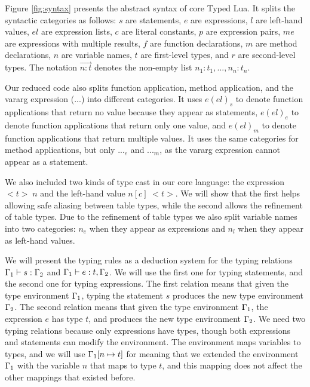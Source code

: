 Figure \ref{fig:syntax} presents the abstract syntax of core Typed Lua.
It splits the syntactic categories as follows:
$s$ are statements, $e$ are expressions, $l$ are left-hand values,
$el$ are expression lists, $c$ are literal constants, $p$ are expression pairs,
$me$ are expressions with multiple results, $f$ are function declarations,
$m$ are method declarations, $n$ are variable names,
$t$ are first-level types, and $r$ are second-level types.
The notation $\vec{n{:}t}$ denotes the non-empty list
$n_{1}{:}t_{1}, ..., n_{n}{:}t_{n}$.

Our reduced code also splits function application, method application, and
the vararg expression (${...}$) into different categories.
It uses $e(el)_{s}$ to denote function applications that return no value
because they appear as statements,
$e(el)_{e}$ to denote function applications that return only one value,
and $e(el)_{m}$ to denote function applications that return multiple values.
It uses the same categories for method applications, but only ${...}_{e}$
and ${...}_{m}$, as the vararg expression cannot appear as a statement.

We also included two kinds of type cast in our core language:
the expression ${<}t{>} \;n$ and the left-hand value $n[c] \; {<}t{>}$.
We will show that the first helps allowing safe aliasing between
table types, while the second allows the refinement of table types.
Due to the refinement of table types we also split variable names
into two categories: $n_{e}$ when they appear as expressions and
$n_{l}$ when they appear as left-hand values.

We will present the typing rules as a deduction system for the typing
relations $\Gamma_{1} \vdash s : \Gamma_{2}$ and $\Gamma_{1} \vdash e : t, \Gamma_{2}$. 
We will use the first one for typing statements, and the second one
for typing expressions.
The first relation means that given the type environment $\Gamma_{1}$,
typing the statement $s$ produces the new type environment $\Gamma_{2}$. 
The second relation means that given the type environment $\Gamma_{1}$,
the expression $e$ has type $t$, and produces the new type environment $\Gamma_{2}$.
We need two typing relations because only expressions have types,
though both expressions and statements can modify the environment.
The environment maps variables to types, and we will use $\Gamma_{1}[n \mapsto t]$
for meaning that we extended the environment $\Gamma_{1}$ with the
variable $n$ that maps to type $t$, and this mapping does not affect
the other mappings that existed before.

